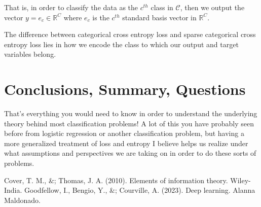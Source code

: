 \documentclass[12pt]{article}
\theoremstyle{definition}
\numberwithin{equation}{section}
\newcommand{\R}{\ensuremath{\mathbb{R}}}
\begin{document}
That is, in order to classify the data as the $c^{th}$ class in $\mathcal{C}$, then we output the vector $y = e_c\in \R^C$ where $e_c$ is the $c^{th}$ standard basis vector in $\R^C$.\smallskip


The difference between categorical cross entropy loss and sparse categorical cross entropy loss lies in how we encode the class to which our output and target variables belong.

\section{Conclusions, Summary, Questions}

That's everything you would need to know in order to understand the underlying theory behind most classification problems! A lot of this you have probably seen before from logistic regression or another classification problem, but having a more generalized treatment of loss and entropy I believe helps us realize under what assumptions and perspectives we are taking on in order to do these sorts of problems.

\newpage

\begin{thebibliography}{2}
     Cover, T. M., \&; Thomas, J. A. (2010). Elements of information theory. Wiley-India. 
     Goodfellow, I., Bengio, Y., \&; Courville, A. (2023). Deep learning. Alanna Maldonado. 
\end{thebibliography}
\end{document}
